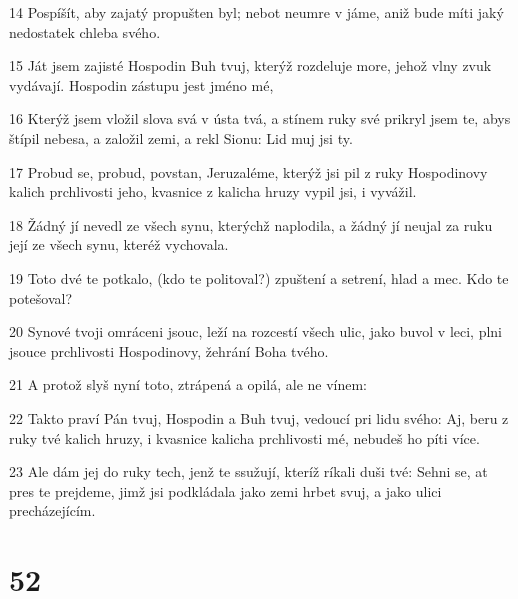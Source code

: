\par 14 Pospíšít, aby zajatý propušten byl; nebot neumre v jáme, aniž bude míti jaký nedostatek chleba svého.
\par 15 Ját jsem zajisté Hospodin Buh tvuj, kterýž rozdeluje more, jehož vlny zvuk vydávají. Hospodin zástupu jest jméno mé,
\par 16 Kterýž jsem vložil slova svá v ústa tvá, a stínem ruky své prikryl jsem te, abys štípil nebesa, a založil zemi, a rekl Sionu: Lid muj jsi ty.
\par 17 Probud se, probud, povstan, Jeruzaléme, kterýž jsi pil z ruky Hospodinovy kalich prchlivosti jeho, kvasnice z kalicha hruzy vypil jsi, i vyvážil.
\par 18 Žádný jí nevedl ze všech synu, kterýchž naplodila, a žádný jí neujal za ruku její ze všech synu, kteréž vychovala.
\par 19 Toto dvé te potkalo, (kdo te politoval?) zpuštení a setrení, hlad a mec. Kdo te potešoval?
\par 20 Synové tvoji omráceni jsouc, leží na rozcestí všech ulic, jako buvol v leci, plni jsouce prchlivosti Hospodinovy, žehrání Boha tvého.
\par 21 A protož slyš nyní toto, ztrápená a opilá, ale ne vínem:
\par 22 Takto praví Pán tvuj, Hospodin a Buh tvuj, vedoucí pri lidu svého: Aj, beru z ruky tvé kalich hruzy, i kvasnice kalicha prchlivosti mé, nebudeš ho píti více.
\par 23 Ale dám jej do ruky tech, jenž te ssužují, kteríž ríkali duši tvé: Sehni se, at pres te prejdeme, jimž jsi podkládala jako zemi hrbet svuj, a jako ulici precházejícím.

\chapter{52}

